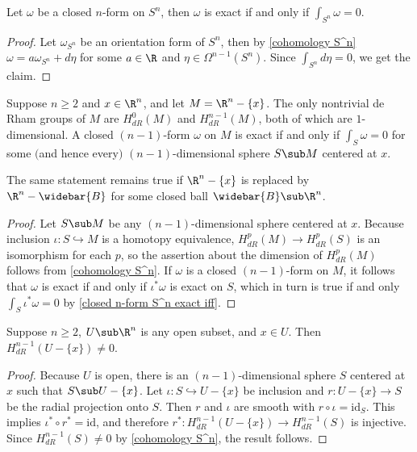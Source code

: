 \begin{corollary}\label{closed n-form S^n exact iff}
Let $\omega$ be a closed $n$-form on $S^n$, then $\omega$ is exact if and only if $\int_{S^n}\omega=0$.
\end{corollary}
\begin{proof}
Let $\omega_{S^n}$ be an orientation form of $S^n$, then by \cref{cohomology S^n} $\omega=a\omega_{S^n}+d\eta$ for some $a\in\R$ and $\eta\in\Omega^{n-1}(S^n)$. Since $\int_{S^n}d\eta=0$, we get the claim.
\end{proof}
\begin{corollary}\label{cohomology punctured R^n}
Suppose $n\geq2$ and $x\in\R^n$, and let $M=\R^n-\{x\}$. The only nontrivial de Rham groups of $M$ are $H^0_{dR}(M)$ and $H^{n-1}_{dR}(M)$, both of which are $1$-dimensional. A closed $(n-1)$-form $\omega$ on $M$ is exact if and only if $\int_S\omega=0$ for some $($and hence every$)$ $(n-1)$-dimensional sphere $S\sub M$ centered at $x$.\par 
The same statement remains true if $\R^n-\{x\}$ is replaced by $\R^n-\widebar{B}$ for some closed ball $\widebar{B}\sub\R^n$.
\end{corollary}
\begin{proof}
Let $S\sub M$ be any $(n-1)$-dimensional sphere centered at $x$. Because inclusion $\iota:S\hookrightarrow M$ is a homotopy equivalence, $H^p_{dR}(M)\to H^p_{dR}(S)$ is an isomorphism for each $p$, so the assertion about the dimension of $H^p_{dR}(M)$ follows from \cref{cohomology S^n}. If $\omega$ is a closed $(n-1)$-form on $M$, it follows that $\omega$ is exact if and only if $\iota^*\omega$ is exact on $S$, which in turn is true if and only $\int_S\iota^*\omega=0$ by \cref{closed n-form S^n exact iff}.
\end{proof}
\begin{corollary}\label{cohomology U-x}
Suppose $n\geq 2$, $U\sub\R^n$ is any open subset, and $x\in U$. Then $H^{n-1}_{dR}(U-\{x\})\neq 0$.
\end{corollary}
\begin{proof}
Because $U$ is open, there is an $(n-1)$-dimensional sphere $S$ centered at $x$ such that $S\sub U-\{x\}$. Let $\iota:S\hookrightarrow U-\{x\}$ be inclusion and $r:U-\{x\}\to S$ be the radial projection onto $S$. Then $r$ and $\iota$ are smooth with $r\circ\iota=\mathrm{id}_S$. This implies $\iota^*\circ r^*=\mathrm{id}$, and therefore $r^*:H^{n-1}_{dR}(U-\{x\})\to H^{n-1}_{dR}(S)$ is injective. Since $H^{n-1}_{dR}(S)\neq 0$ by \cref{cohomology S^n}, the result follows.
\end{proof}
